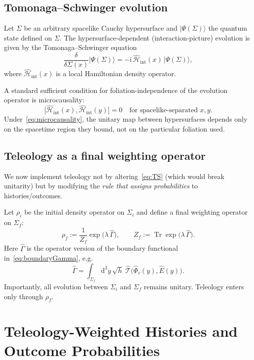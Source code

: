 \documentclass[reprint,amsmath,amssymb,aps,showkeys]{revtex4-2}
\newcommand{\ket}[1]{\lvert #1\rangle}
\newcommand{\dd}{\mathrm{d}}
\newcommand{\ii}{\mathrm{i}}
\newcommand{\Tr}{\operatorname{Tr}}
\newcommand{\cH}{\mathcal{H}}
\newcommand{\cT}{\mathcal{T}}
\begin{document}
\subsection{Tomonaga--Schwinger evolution}
Let $\Sigma$ be an arbitrary spacelike Cauchy hypersurface and $\ket{\Psi(\Sigma)}$ the quantum state defined on $\Sigma$. The hypersurface-dependent (interaction-picture) evolution is given by the Tomonaga--Schwinger equation
\begin{equation}
\frac{\delta}{\delta\Sigma(x)}\ket{\Psi(\Sigma)} = -\ii\,\hat{\cH}_{\text{int}}(x)\,\ket{\Psi(\Sigma)},
\label{eq:TS}
\end{equation}
where $\hat{\cH}_{\text{int}}(x)$ is a local Hamiltonian density operator.

A standard sufficient condition for foliation-independence of the evolution operator is microcausality:
\begin{equation}
\big[\hat{\cH}_{\text{int}}(x),\hat{\cH}_{\text{int}}(y)\big]=0\quad\text{for spacelike-separated }x,y.
\label{eq:microcausality}
\end{equation}
Under~\eqref{eq:microcausality}, the unitary map between hypersurfaces depends only on the spacetime region they bound, not on the particular foliation used.

\subsection{Teleology as a final weighting operator}
We now implement teleology not by altering~\eqref{eq:TS} (which would break unitarity) but by modifying the \emph{rule that assigns probabilities} to histories/outcomes.

Let $\rho_i$ be the initial density operator on $\Sigma_i$ and define a final weighting operator on $\Sigma_f$:
\begin{equation}
\rho_f := \frac{1}{Z_f}\exp\big(\lambda\,\hat{\Gamma}\big),
\qquad
Z_f:=\Tr\exp\big(\lambda\,\hat{\Gamma}\big).
\label{eq:rhof}
\end{equation}
Here $\hat{\Gamma}$ is the operator version of the boundary functional in~\eqref{eq:boundaryGamma}, e.g.
\begin{equation}
\hat{\Gamma} = \int_{\Sigma_f} \dd^3y\,\sqrt{h}\;\hat{\cT}\big(\hat{\Phi}_c(y),\hat{E}(y)\big).
\label{eq:GammaOp}
\end{equation}
Importantly, all evolution between $\Sigma_i$ and $\Sigma_f$ remains unitary. Teleology enters only through $\rho_f$.

\section{Teleology-Weighted Histories and Outcome Probabilities}
\end{document}
